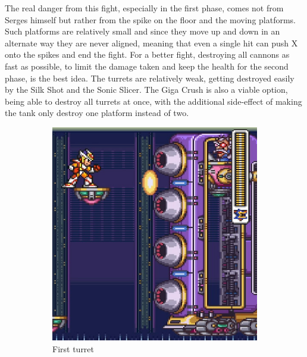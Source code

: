 The real danger from this fight, especially in the first phase, comes not from Serges himself but rather from the spike on the floor and the moving platforms. Such platforms are relatively small and since they move up and down in an alternate way they are never aligned, meaning that even a single hit can push X onto the spikes and end the fight. For a better fight, destroying all cannons as fast as possible, to limit the damage taken and keep the health for the second phase, is the best idea. The turrets are relatively weak, getting destroyed easily by the Silk Shot and the Sonic Slicer. The Giga Crush is also a viable option, being able to destroy all turrets at once, with the additional side-effect of making the tank only destroy one platform instead of two.
\begin{figure}[htp]
	\centering
	\begin{subfigure}{0.32\linewidth}
		\centering
		\includegraphics[width=\linewidth]{figures/X2/Hunter_stages/Serges_tank_1.png}
		\caption{First turret}	
	\end{subfigure}
	\begin{subfigure}{0.32\linewidth}
		\centering

\end{subfigure}
\end{figure}
